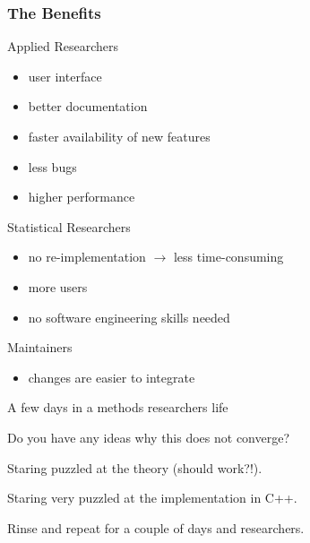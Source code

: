 \documentclass{beamer}
\newenvironment{wideitemize}{
    \itemize\addtolength{\itemsep}{15pt}\addtolength{\topsep}{10pt}}{\enditemize}
\begin{document}
    \begin{frame}
        \frametitle{The Benefits}
        \vspace{0.5cm}
        \begin{wideitemize}
            \item Applied Researchers
            \begin{itemize}
                \item user interface
                \item better documentation
                \item faster availability of new features
                \item less bugs
                \item higher performance
            \end{itemize}
            \item Statistical Researchers
            \begin{itemize}
                \item no re-implementation $\to$ less time-consuming
                \item more users
                \item no software engineering skills needed
            \end{itemize}
            \item Maintainers
            \begin{itemize}
                \item changes are easier to integrate
            \end{itemize}
        \end{wideitemize}
    \end{frame}
    

    \begin{frame}{A few days in a methods researchers life}
        \begin{wideitemize}
        \item Do you have any ideas why this does not converge?
        \item Staring puzzled at the theory (should work?!).
        \item Staring very puzzled at the implementation in C++.
        \item Rinse and repeat for a couple of days and researchers.
        \end{wideitemize}
    \end{frame}
\end{document}
